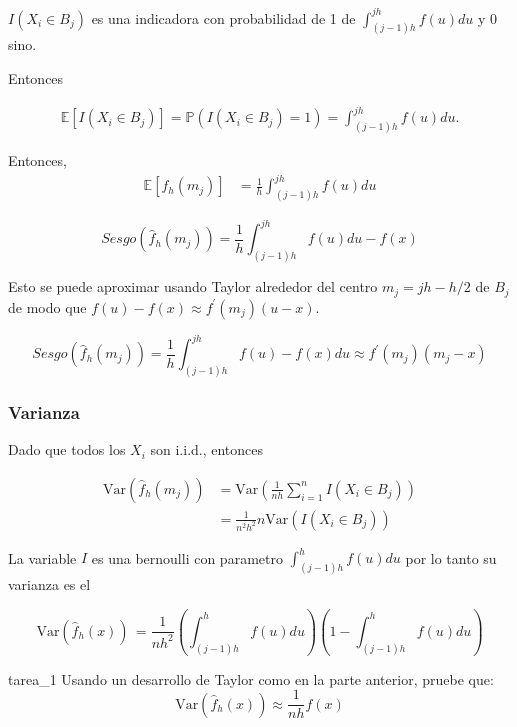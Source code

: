 \documentclass[12pt]{book}\usepackage[]{graphicx}\usepackage[]{color}
\theoremstyle{definition}
\theoremstyle{plain}
\begin{document}
\(I(X_i \in B_j)\) es una indicadora con probabilidad de 1 de \(\int_{(j -
	1)h}^{jh} f(u)du\) y 0 sino.

Entonces

\begin{align*}
	\mathbb{E}\left[ I(X_i \in B_j)\right] = \mathbb{P}\left(I(X_i \in
	B_j)=1\right) = \int_{(j - 1)h}^{jh} f(u)du.
\end{align*}

Entonces,
\begin{align*}
	\mathbb{E}\left[{f}_h(m_j)\right]
	  & = \frac{1}{h} \int_{(j - 1)h}^{jh} f(u)du
\end{align*}

\begin{equation*}
	Sesgo(\hat{f}_h(m_j)) = \frac{1}{h} \int_{(j -
		1)h}^{jh} f(u)du - f(x)
\end{equation*}

Esto se puede aproximar usando Taylor alrededor del centro \(m_j = jh - h/2\) de \(B_j\) de modo que \(f(u) - f(x) \approx f^{\prime}(m_j)(u - x)\).

\begin{equation*}
	Sesgo(\hat{f}_h(m_j)) =  \frac{1}{h} \int_{(j -
		1)h}^{jh} f(u) - f(x) du \approx f^\prime(m_j)(m_j - x)
\end{equation*}

\subsubsection{Varianza}

Dado que todos los \(X_i\) son i.i.d., entonces

\begin{align*}
	\mathrm{Var}\left( \hat{f}_h(m_j)\right) & =
	\mathrm{Var}\left( \frac{1}{nh} \sum_{i = 1}^{n} I(X_i \in B_j)\right)                                  \\
	                                         & = \frac{1}{n^2h^2} n\mathrm{Var}\left( I(X_i \in B_j)\right)
\end{align*}

La variable \(I\) es una bernoulli con parametro \(\int_{(j - 1)h}^{h} f(u)du\) por lo tanto su varianza es el

\begin{equation*}
	\mathrm{Var}\left( \hat{f}_h(x)\right)\, =
	\frac{1}{nh^2} \left(\int_{(j - 1)h}^{h} f(u)du \right)\left( 1 -\int_{(j - 1)h}^{h} f(u)du \right)
\end{equation*}

\begin{tarea}{}{tarea_1}
	Usando un desarrollo de Taylor como en la parte anterior, pruebe que:
	\begin{equation*}
		\mathrm{Var}\left( \hat{f}_h(x)\right)\approx
		\frac{1}{nh} f(x)
	\end{equation*}
\end{tarea}
\end{document}
